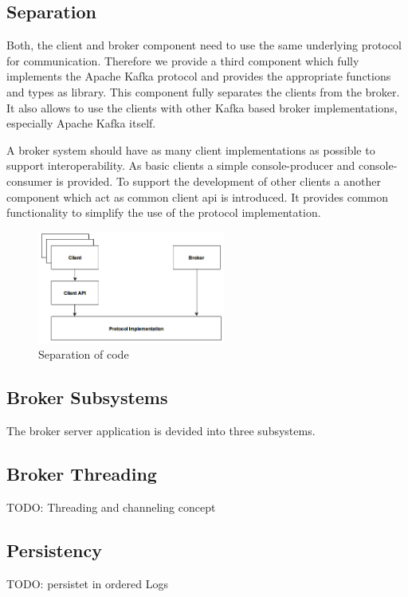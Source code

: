 \subsection{Separation} 
Both, the client and broker component need to use the same underlying protocol for
communication. Therefore we provide a third component which fully implements the Apache Kafka
protocol  and provides the appropriate functions and types as library.
This component fully separates the clients from the broker. It also allows to
use the clients with other Kafka based broker implementations, especially Apache
Kafka itself. 

A broker system should have as many client implementations as possible to
support interoperability. As basic clients a simple console-producer and
console-consumer is provided. To support the development of other clients a
another component which act as common client api is introduced. It provides
common functionality to simplify the use of the protocol implementation. 

\begin{figure}[H]
    \centering
    \includegraphics[width=0.55\textwidth]{images/architecture-components.png}
    \caption{Separation of code}
    \label{fig:architecture-components.png}
\end{figure}

\subsection{Broker Subsystems}
The broker server application is devided into three subsystems. 

\subsection{Broker Threading}
TODO: Threading and channeling concept 

\subsection{Persistency}
TODO: persistet in ordered Logs


